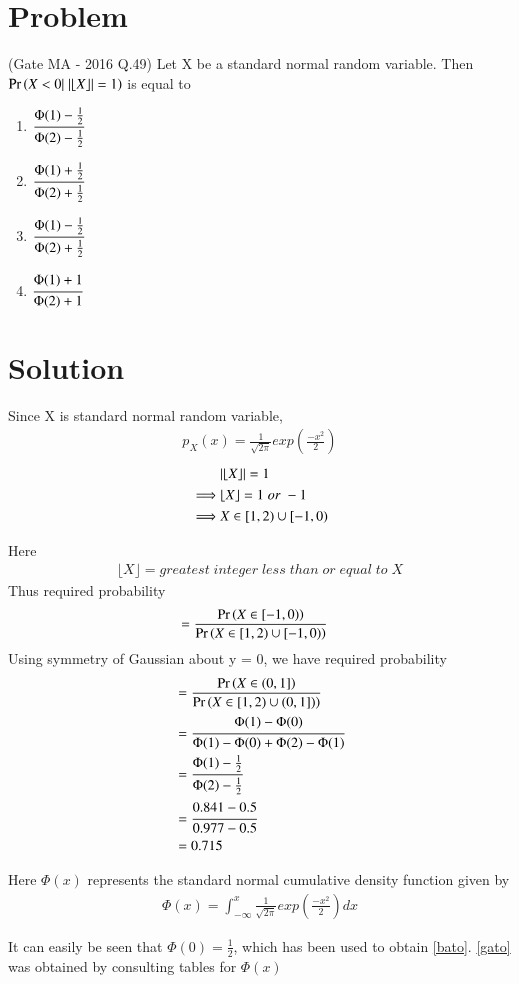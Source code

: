 \documentclass[journal,12pt,twocolumn]{IEEEtran}
\begin{document}
\section{Problem}
(Gate MA - 2016 Q.49) Let X be a standard normal random variable. Then $\Pr\left(X < 0 |\;\vert\lfloor X\rfloor\vert = 1\right)$ is equal to
\begin{enumerate}[label = \alph*)]
    \item $\cfrac{\Phi(1) - \frac{1}{2}}{\Phi(2) - \frac{1}{2}}$
    \item $\cfrac{\Phi(1) + \frac{1}{2}}{\Phi(2) + \frac{1}{2}}$
    \item $\cfrac{\Phi(1) - \frac{1}{2}}{\Phi(2) + \frac{1}{2}}$
    \item $\cfrac{\Phi(1) + 1}{\Phi(2) + 1}$
\end{enumerate}
\section{Solution}
Since X is standard normal random variable, 
\begin{align}
    p_X(x) = \frac{1}{\sqrt{2\pi}} exp(\frac{-x^2}{2})
\end{align}
\begin{align}
    &\vert\lfloor X\rfloor\vert = 1\\
    \implies &\lfloor X\rfloor = 1\; or\; -1\\
    \implies &X \in [1, 2) \cup [-1, 0)
\end{align}

Here 
\begin{align*}
    \lfloor X\rfloor = greatest\; integer\; less\; than\; or\; equal\; to\; X
\end{align*}
Thus required probability
\begin{align}
    &= \frac{\Pr\left(X\in [-1,0)\right)}{\Pr\left(X \in [1, 2) \cup [-1, 0)\right)}
\end{align} 
Using symmetry of Gaussian about y = 0, we have required probability 
\begin{align}
    &= \frac{\Pr\left(X\in (0,1]\right)}{\Pr\left(X \in [1, 2) \cup (0, 1])\right)}\\
    &= \cfrac{\Phi(1) - \Phi(0)}{\Phi(1) - \Phi(0) + \Phi(2) - \Phi(1)}\\
    &= \cfrac{\Phi(1) - \frac{1}{2}}{\Phi(2) - \frac{1}{2}}\label{bato}\\
    &= \cfrac{0.841 - 0.5}{0.977 - 0.5}\label{gato}\\
    &= 0.715
\end{align}

Here $\Phi(x)$ represents the standard normal cumulative density function given by
\begin{align}
    \Phi(x) = \int_{-\infty}^x \frac{1}{\sqrt{2\pi}} exp(\frac{-x^2}{2}) dx
\end{align}

It can easily be seen that $\Phi(0) = \frac{1}{2}$, which has been used to obtain \eqref{bato}.
\eqref{gato} was obtained by consulting tables for $\Phi(x)$
\end{document}
